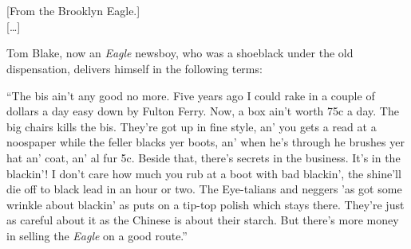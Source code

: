 \begin{ipquote}
\begin{center}
\\
\\
{[From the Brooklyn Eagle.]}\\
{[…]}
\end{center}

Tom Blake, now an \textit{Eagle} newsboy, who was a sho{\kern0pt}eblack under the old dispensation, delivers himself in the following terms:

{“The bis ain’t any good no more. Five years ago I could rake in a couple of dollars a day easy down by Fulton Ferry. Now, a box ain’t worth 75c a day. The big chairs kills the bis. They’re got up in fine style, an’ you gets a read at a noospaper while the feller blacks yer boots, an’ when he’s through he brushes yer hat an’ coat, an’ al fur 5c. Beside that, there’s secrets in the business. It’s in the blackin’! I don’t care how much you rub at a boot with bad blackin’, the shine’ll die off to black lead in an hour or two. The Eye-talians and neggers ’as got some wrinkle about blackin’ as puts on a tip-top polish which stays there. They’re just as careful about it as the Chinese is about their starch. But there’s more money in selling the \textit{Eagle} on a good route.”

\centering {[…]}\\
}
\end{ipquote}

